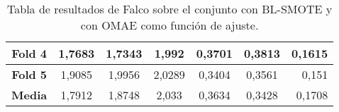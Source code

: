 \begin{table}[H]
{\begin{tabular}{|crrrrrr|}
\multicolumn{1}{|c|}{\textbf{Fold 4}} & \multicolumn{1}{c|}{1,7683}            & \multicolumn{1}{c|}{1,7343}              & \multicolumn{1}{c|}{1,992}           & \multicolumn{1}{c|}{0,3701}            & \multicolumn{1}{c|}{0,3813}              & 0,1615                             \\ \hline
\multicolumn{1}{|c|}{\textbf{Fold 5}} & \multicolumn{1}{c|}{1,9085}            & \multicolumn{1}{c|}{1,9956}              & \multicolumn{1}{c|}{2,0289}          & \multicolumn{1}{c|}{0,3404}            & \multicolumn{1}{c|}{0,3561}              & 0,151                              \\ \hline
\multicolumn{1}{|c|}{\textbf{Media}}  & \multicolumn{1}{c|}{1,7912}           & \multicolumn{1}{c|}{1,8748}             & \multicolumn{1}{c|}{2,033}           & \multicolumn{1}{c|}{0,3634}           & \multicolumn{1}{c|}{0,3428}              & 0,1708                            \\ \hline
\end{tabular}%
}
\caption{Tabla de resultados de Falco sobre el conjunto con BL-SMOTE y con OMAE como función de ajuste.}\label{tablaFALCOconBLSMOTEconOMAE}

\end{table}

